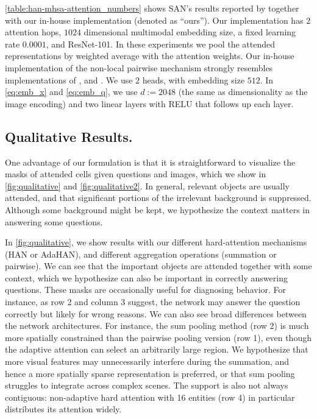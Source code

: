 \autoref{table:han-mhsa-attention_numbers} shows SAN's \cite{yang2015stacked} results reported by \cite{agrawal2017don} together with our in-house implementation (denoted as ``ours''). Our implementation has 2 attention hops, $1024$ dimensional multimodal embedding size, a fixed learning rate $0.0001$, and ResNet-101. In these experiments we pool the attended representations by weighted average with the attention weights.
Our in-house implementation of the non-local pairwise mechanism strongly resembles implementations of \cite{wang2017non}, and \cite{vaswani2017attention}. We use $2$ heads, with embedding size $512$.
In \autoref{eq:emb_x} and \autoref{eq:emb_q}, we use $d := 2048$ (the same as dimensionality as the image encoding) and two linear layers with RELU that follows up each layer.


\subsection{Qualitative Results.}
\label{sec:qualitative}
One advantage of our formulation is that it is straightforward to visualize the masks of attended cells given questions and images, which we show in \autoref{fig:qualitative} and \autoref{fig:qualitative2}.
In general, relevant objects are usually attended, and that significant portions of the irrelevant background is suppressed. Although some background might be kept, we hypothesize the context matters in answering some questions.

In \autoref{fig:qualitative}, we show results with our different hard-attention mechanisms (HAN or AdaHAN), and different aggregation operations (summation or pairwise). We can see that the important objects are attended together with some context, which we hypothesize can also be important in correctly answering questions. These masks
are occasionally useful for diagnosing behavior. For instance, as row 2 and column 3 suggest, the network may answer the question correctly but likely for wrong reasons. 
We can also see broad differences between the network architectures.  For instance, the sum pooling method (row 2) is much more spatially constrained than the pairwise pooling version (row 1), even though the adaptive attention can select an arbitrarily large region.   We hypothesize that more visual features may unnecessarily interfere during the summation, and hence a more spatially sparse representation is preferred, or that sum pooling struggles to integrate across complex scenes.  The support is also not always contiguous: non-adaptive hard attention with 16 entities (row 4) in particular distributes its attention widely. 



